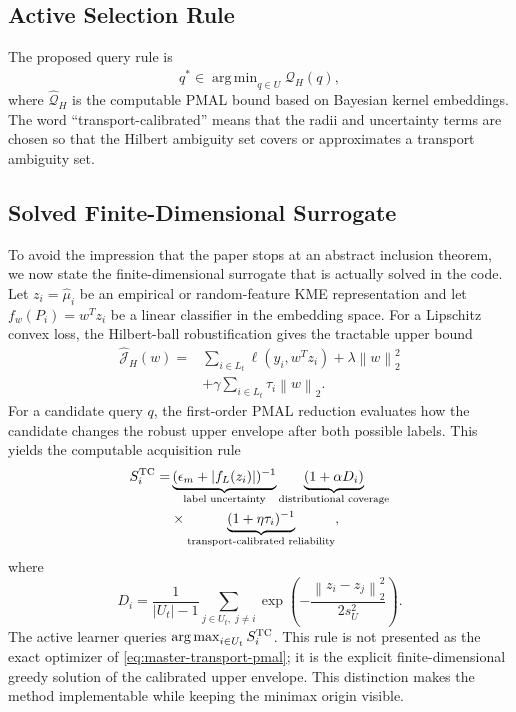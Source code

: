 \documentclass[10pt,journal]{IEEEtran}
\DeclareMathOperator*{\argmin}{arg\,min}
\DeclareMathOperator*{\argmax}{arg\,max}
\newcommand{\Jcal}{\mathcal{J}}
\newcommand{\wh}{\widehat}
\newcommand{\norm}[1]{\left\lVert #1 \right\rVert}
\begin{document}
\subsection{Active Selection Rule}

The proposed query rule is
\begin{equation}
\label{eq:selection}
    q^*\in\argmin_{q\in U}\wh{\mathcal{Q}}_H(q),
\end{equation}
where $\wh{\mathcal{Q}}_H$ is the computable PMAL bound based on Bayesian kernel embeddings. The word ``transport-calibrated'' means that the radii and uncertainty terms are chosen so that the Hilbert ambiguity set covers or approximates a transport ambiguity set.

\subsection{Solved Finite-Dimensional Surrogate}
\label{subsec:finite-surrogate}

To avoid the impression that the paper stops at an abstract inclusion theorem, we now state the finite-dimensional surrogate that is actually solved in the code. Let $z_i=\wh\mu_i$ be an empirical or random-feature KME representation and let $f_w(P_i)=w^Tz_i$ be a linear classifier in the embedding space. For a Lipschitz convex loss, the Hilbert-ball robustification gives the tractable upper bound
\begin{equation}
\label{eq:robust-empirical-upper}
\begin{aligned}
\widehat{\Jcal}_H(w)
= &\sum_{i\in L_t} \ell(y_i,w^Tz_i)
   + \lambda\norm{w}_2^2 \\
&+ \gamma\sum_{i\in L_t}\tau_i\norm{w}_2 .
\end{aligned}
\end{equation}
For a candidate query $q$, the first-order PMAL reduction evaluates how the candidate changes the robust upper envelope after both possible labels. This yields the computable acquisition rule
\begin{equation}
\label{eq:tc-acquisition-compact}
\begin{aligned}
S_i^{\rm TC}
=&\underbrace{(\epsilon_m+|f_L(z_i)|)^{-1}}_{\text{label uncertainty}}
\underbrace{(1+\alpha D_i)}_{\text{distributional coverage}}\\
&\times
\underbrace{(1+\eta\tau_i)^{-1}}_{\text{transport-calibrated reliability}},
\end{aligned}
\end{equation}
where
\begin{equation}
\label{eq:density-score}
D_i=\frac{1}{|U_t|-1}\sum_{j\in U_t,\;j\ne i}
\exp\!\left(-\frac{\norm{z_i-z_j}_2^2}{2s_U^2}\right).
\end{equation}
The active learner queries $\argmax_{i\in U_t}S_i^{\rm TC}$. This rule is not presented as the exact optimizer of \eqref{eq:master-transport-pmal}; it is the explicit finite-dimensional greedy solution of the calibrated upper envelope. This distinction makes the method implementable while keeping the minimax origin visible.
\end{document}

